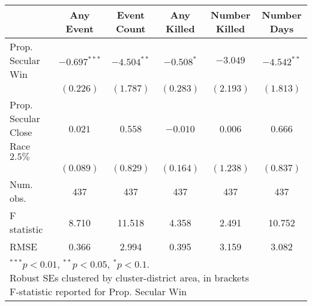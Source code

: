 
\begin{tabular}{l c c c c c }
\hline
 & Any Event & Event Count & Any Killed & Number Killed & Number Days \\
\hline
Prop. Secular Win                & $-0.697^{***}$ & $-4.504^{**}$ & $-0.508^{*}$ & $-3.049$  & $-4.542^{**}$ \\
                                 & $(0.226)$      & $(1.787)$     & $(0.283)$    & $(2.193)$ & $(1.813)$     \\
Prop. Secular Close Race $2.5\%$ & $0.021$        & $0.558$       & $-0.010$     & $0.006$   & $0.666$       \\
                                 & $(0.089)$      & $(0.829)$     & $(0.164)$    & $(1.238)$ & $(0.837)$     \\
\hline
Num. obs.                        & 437            & 437           & 437          & 437       & 437           \\
F statistic                      & 8.710          & 11.518        & 4.358        & 2.491     & 10.752        \\
RMSE                             & 0.366          & 2.994         & 0.395        & 3.159     & 3.082         \\
\hline
\multicolumn{6}{l}{\scriptsize{\parbox{.6\linewidth}{\vspace{2pt}$^{***}p<0.01$, $^{**}p<0.05$, $^*p<0.1$. \\
       Robust SEs clustered by cluster-district area, in brackets\\ F-statistic reported for Prop. Secular Win}}}
\end{tabular}
